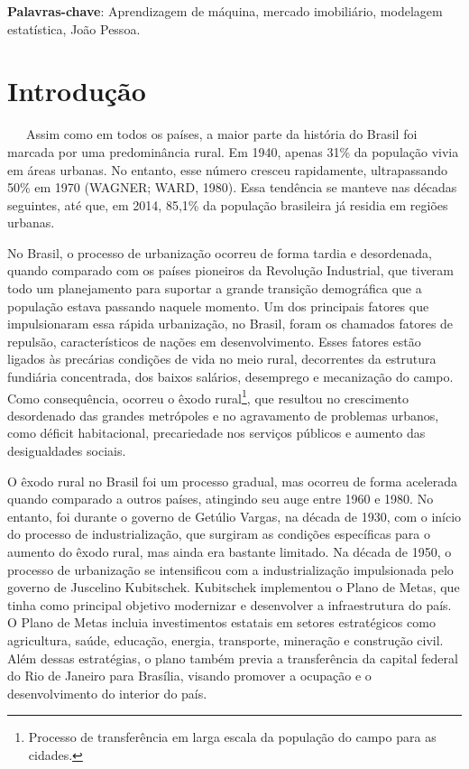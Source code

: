 \documentclass[
  12pt,
  a4paper,
]{scrreprt}
\begin{document}
\begin{flushleft}
\textbf{Palavras-chave}: Aprendizagem de máquina, mercado imobiliário, modelagem estatística, João Pessoa.
\end{flushleft}

\chapter{Introdução}\label{introduuxe7uxe3o}

~~~Assim como em todos os países, a maior parte da história do Brasil
foi marcada por uma predominância rural. Em 1940, apenas 31\% da
população vivia em áreas urbanas. No entanto, esse número cresceu
rapidamente, ultrapassando 50\% em 1970 (WAGNER; WARD, 1980). Essa
tendência se manteve nas décadas seguintes, até que, em 2014, 85,1\% da
população brasileira já residia em regiões urbanas.

\vspace{12pt}

No Brasil, o processo de urbanização ocorreu de forma tardia e
desordenada, quando comparado com os países pioneiros da Revolução
Industrial, que tiveram todo um planejamento para suportar a grande
transição demográfica que a população estava passando naquele momento.
Um dos principais fatores que impulsionaram essa rápida urbanização, no
Brasil, foram os chamados fatores de repulsão, característicos de nações
em desenvolvimento. Esses fatores estão ligados às precárias condições
de vida no meio rural, decorrentes da estrutura fundiária concentrada,
dos baixos salários, desemprego e mecanização do campo. Como
consequência, ocorreu o êxodo rural\footnote{Processo de transferência
  em larga escala da população do campo para as cidades.}, que resultou
no crescimento desordenado das grandes metrópoles e no agravamento de
problemas urbanos, como déficit habitacional, precariedade nos serviços
públicos e aumento das desigualdades sociais.

\vspace{12pt}

O êxodo rural no Brasil foi um processo gradual, mas ocorreu de forma
acelerada quando comparado a outros países, atingindo seu auge entre
1960 e 1980. No entanto, foi durante o governo de Getúlio Vargas, na
década de 1930, com o início do processo de industrialização, que
surgiram as condições específicas para o aumento do êxodo rural, mas
ainda era bastante limitado. Na década de 1950, o processo de
urbanização se intensificou com a industrialização impulsionada pelo
governo de Juscelino Kubitschek. Kubitschek implementou o Plano de
Metas, que tinha como principal objetivo modernizar e desenvolver a
infraestrutura do país. O Plano de Metas incluia investimentos estatais
em setores estratégicos como agricultura, saúde, educação, energia,
transporte, mineração e construção civil. Além dessas estratégias, o
plano também previa a transferência da capital federal do Rio de Janeiro
para Brasília, visando promover a ocupação e o desenvolvimento do
interior do país.
\end{document}

